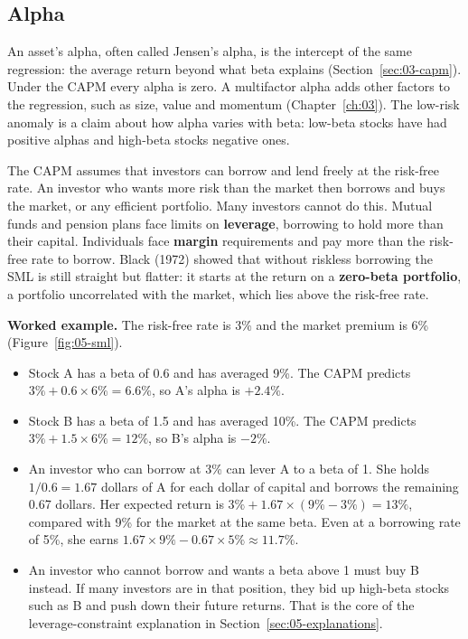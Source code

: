 \subsection{Alpha}

An asset's alpha, often called Jensen's alpha, is the intercept of the same regression: the average return beyond what beta explains (Section~\ref{sec:03-capm}). Under the CAPM every alpha is zero. A multifactor alpha adds other factors to the regression, such as size, value and momentum (Chapter~\ref{ch:03}). The low-risk anomaly is a claim about how alpha varies with beta: low-beta stocks have had positive alphas and high-beta stocks negative ones.

The CAPM assumes that investors can borrow and lend freely at the risk-free rate. An investor who wants more risk than the market then borrows and buys the market, or any efficient portfolio. Many investors cannot do this. Mutual funds and pension plans face limits on \textbf{leverage}, borrowing to hold more than their capital. Individuals face \textbf{margin} requirements and pay more than the risk-free rate to borrow. Black (1972) showed that without riskless borrowing the SML is still straight but flatter: it starts at the return on a \textbf{zero-beta portfolio}, a portfolio uncorrelated with the market, which lies above the risk-free rate.

\textbf{Worked example.} The risk-free rate is 3\% and the market premium is 6\% (Figure~\ref{fig:05-sml}).

\begin{itemize}
  \item Stock A has a beta of 0.6 and has averaged 9\%. The CAPM predicts $3\% + 0.6 \times 6\% = 6.6\%$, so A's alpha is $+2.4\%$.
  \item Stock B has a beta of 1.5 and has averaged 10\%. The CAPM predicts $3\% + 1.5 \times 6\% = 12\%$, so B's alpha is $-2\%$.
  \item An investor who can borrow at 3\% can lever A to a beta of 1. She holds $1/0.6 = 1.67$ dollars of A for each dollar of capital and borrows the remaining 0.67 dollars. Her expected return is $3\% + 1.67 \times (9\% - 3\%) = 13\%$, compared with 9\% for the market at the same beta. Even at a borrowing rate of 5\%, she earns $1.67 \times 9\% - 0.67 \times 5\% \approx 11.7\%$.
  \item An investor who cannot borrow and wants a beta above 1 must buy B instead. If many investors are in that position, they bid up high-beta stocks such as B and push down their future returns. That is the core of the leverage-constraint explanation in Section~\ref{sec:05-explanations}.
\end{itemize}

